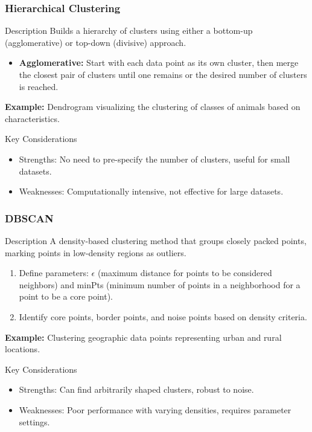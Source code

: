 \documentclass[aspectratio=169]{beamer}
\begin{document}
\begin{frame}[fragile]
    \frametitle{Hierarchical Clustering}
    \begin{block}{Description}
        Builds a hierarchy of clusters using either a bottom-up (agglomerative) or top-down (divisive) approach.
    \end{block}
    \begin{itemize}
        \item \textbf{Agglomerative:} Start with each data point as its own cluster, then merge the closest pair of clusters until one remains or the desired number of clusters is reached.
    \end{itemize}
    \textbf{Example:} Dendrogram visualizing the clustering of classes of animals based on characteristics.
    
    \begin{block}{Key Considerations}
        \begin{itemize}
            \item Strengths: No need to pre-specify the number of clusters, useful for small datasets.
            \item Weaknesses: Computationally intensive, not effective for large datasets.
        \end{itemize}
    \end{block}
\end{frame}

\begin{frame}[fragile]
    \frametitle{DBSCAN}
    \begin{block}{Description}
        A density-based clustering method that groups closely packed points, marking points in low-density regions as outliers.
    \end{block}
    \begin{enumerate}
        \item Define parameters: $\epsilon$ (maximum distance for points to be considered neighbors) and minPts (minimum number of points in a neighborhood for a point to be a core point).
        \item Identify core points, border points, and noise points based on density criteria.
    \end{enumerate}
    \textbf{Example:} Clustering geographic data points representing urban and rural locations.
    
    \begin{block}{Key Considerations}
        \begin{itemize}
            \item Strengths: Can find arbitrarily shaped clusters, robust to noise.
            \item Weaknesses: Poor performance with varying densities, requires parameter settings.
        \end{itemize}
    \end{block}
\end{frame}
\end{document}
